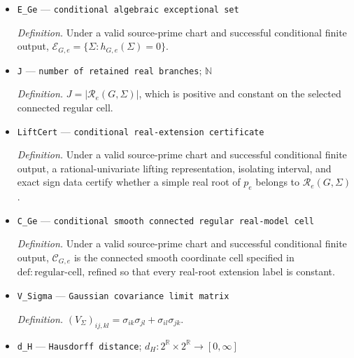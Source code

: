\documentclass{article}
\begin{document}
\begin{itemize}
  \par\smallskip\noindent\emph{Definition.} The dispatcher specified in \(\mathrm{def:certificate\mbox{-}algorithm}\). On the zero-excess tree class it returns the exact \(1/2/\infty\) classification and all one or two finite \(\operatorname{FASTP}\) expressions \(\rho_i\). On positive excess it returns only the randomized Jacobian-rank algebraic/transcendental tag, the size-sensitive universal degree upper bound on the algebraic branch, or the dominance certificate on the transcendental branch; it does not return the exact positive-excess degree or eliminant.
  \item \texttt{E\_\allowbreak{}Ge} --- \texttt{conditional algebraic exceptional set}
  \par\smallskip\noindent\emph{Definition.} Under a valid source-prime chart and successful conditional finite output, \(\mathcal E_{G,e}=\{\Sigma:h_{G,e}(\Sigma)=0\}\).
  \item \texttt{J} --- \texttt{number of retained real branches}; \(\mathbb N\)
  \par\smallskip\noindent\emph{Definition.} \(J=|\mathcal R_e(G,\Sigma)|\), which is positive and constant on the selected connected regular cell.
  \item \texttt{LiftCert} --- \texttt{conditional real-\allowbreak{}extension certificate}
  \par\smallskip\noindent\emph{Definition.} Under a valid source-prime chart and successful conditional finite output, a rational-univariate lifting representation, isolating interval, and exact sign data certify whether a simple real root of \(p_e\) belongs to \(\mathcal R_e(G,\Sigma)\).
  \item \texttt{C\_\allowbreak{}Ge} --- \texttt{conditional smooth connected regular real-\allowbreak{}model cell}
  \par\smallskip\noindent\emph{Definition.} Under a valid source-prime chart and successful conditional finite output, \(\mathcal C_{G,e}\) is the connected smooth coordinate cell specified in \(\mathrm{def:regular\mbox{-}cell}\), refined so that every real-root extension label is constant.
  \item \texttt{V\_\allowbreak{}Sigma} --- \texttt{Gaussian covariance limit matrix}
  \par\smallskip\noindent\emph{Definition.} \((V_\Sigma)_{ij,kl}=\sigma_{ik}\sigma_{jl}+\sigma_{il}\sigma_{jk}\).
  \item \texttt{d\_\allowbreak{}H} --- \texttt{Hausdorff distance}; \(d_H:2^{\mathbb R}\times2^{\mathbb R}\to[0,\infty]\)

\end{itemize}
\end{document}
